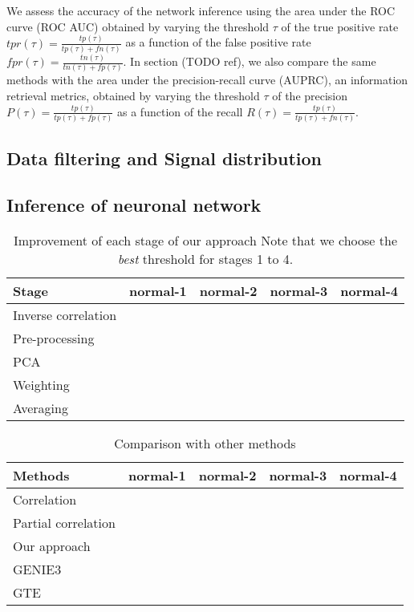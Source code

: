 \documentclass[wcp]{jmlr}
\begin{document}
We assess the accuracy of the network inference using the area under
the ROC curve (ROC AUC) obtained by varying the threshold
$\tau$ of the true positive rate $tpr(\tau) = \frac{tp(\tau)}{tp(\tau) + fn(\tau)}$
as a function of the false positive rate
$fpr(\tau) = \frac{tn(\tau)}{tn(\tau) + fp(\tau)}$. In section (TODO ref),
we also compare the same methods with the area under the precision-recall
curve (AUPRC), an information retrieval metrics, obtained by varying the threshold
$\tau$ of the precision $P(\tau) = \frac{tp(\tau)}{tp(\tau) + fp(\tau)}$
as a function of the recall $R(\tau) = \frac{tp(\tau)}{tp(\tau) + fn(\tau)}$.


\subsection{Data filtering and Signal distribution}

\subsection{Inference of neuronal network}


\begin{table}[htb]
\centering
\caption{Improvement of each stage of our approach Note that we choose the
         \textit{best} threshold for stages 1 to 4.}
\begin{tabular}{*{5}{l}}
\toprule
Stage               & normal-1 & normal-2 & normal-3 & normal-4 \\
\midrule
Inverse correlation & & & & \\
Pre-processing      & & & & \\
PCA                 & & & & \\
Weighting           & & & & \\
Averaging           & & & & \\
\bottomrule
\end{tabular}
\end{table}


\begin{table}[htb]
\centering
\caption{Comparison with other methods}
\begin{tabular}{*{5}{l}}
\toprule
Methods             & normal-1 & normal-2 & normal-3 & normal-4 \\
\midrule
Correlation         & & & & \\
Partial correlation & & & & \\
Our approach        & & & & \\
GENIE3              & & & & \\
GTE                 & & & & \\
\bottomrule
\end{tabular}
\end{table}
\end{document}
